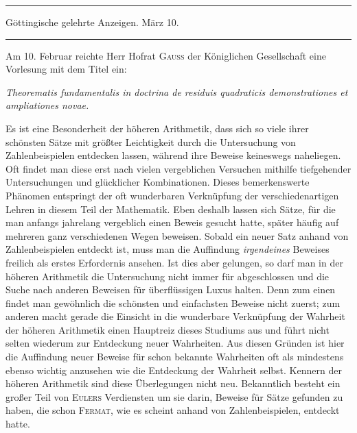 \clearpage
{}%
\begin{center}
\rule{.82\linewidth}{.35pt}\par
Göttingische gelehrte Anzeigen. März 10.\par
\rule{.82\linewidth}{.35pt}
\end{center}
Am 10. Februar reichte Herr Hofrat \textsc{Gauss} der Königlichen Gesellschaft eine Vorlesung mit dem Titel ein:
\begin{center}\itshape
Theorematis fundamentalis in doctrina de residuis quadraticis demonstrationes et ampliationes novae.
\end{center}

Es ist eine Besonderheit der höheren Arithmetik, dass sich so viele ihrer schönsten Sätze mit größter Leichtigkeit durch die Untersuchung von Zahlenbeispielen entdecken lassen, während ihre Beweise keineswegs naheliegen. Oft findet man diese erst nach vielen vergeblichen Versuchen mithilfe tiefgehender Untersuchungen und glücklicher Kombinationen. Dieses bemerkenswerte Phänomen entspringt der oft wunderbaren Verknüpfung der verschiedenartigen Lehren in diesem Teil der Mathematik. Eben deshalb lassen sich Sätze, für die man anfangs jahrelang vergeblich einen Beweis gesucht hatte, später häufig auf mehreren ganz verschiedenen Wegen beweisen. Sobald ein neuer Satz anhand von Zahlenbeispielen entdeckt ist, muss man die Auffindung \emph{irgendeines} Beweises freilich als erstes Erfordernis ansehen. Ist dies aber gelungen, so darf man in der höheren Arithmetik die Untersuchung nicht immer für abgeschlossen und die Suche nach anderen Beweisen für überflüssigen Luxus halten. Denn zum einen findet man gewöhnlich die schönsten und einfachsten
%
Beweise nicht zuerst; zum anderen macht gerade die Einsicht in die wunderbare Verknüpfung der Wahrheit der höheren Arithmetik einen Hauptreiz dieses Studiums aus und führt nicht selten wiederum zur Entdeckung neuer Wahrheiten. Aus diesen Gründen ist hier die Auffindung neuer Beweise für schon bekannte Wahrheiten oft als mindestens ebenso wichtig anzusehen wie die Entdeckung der Wahrheit selbst. Kennern der höheren Arithmetik sind diese Überlegungen nicht neu. Bekanntlich besteht ein großer Teil von \textsc{Eulers} Verdiensten um sie darin, Beweise für Sätze gefunden zu haben, die schon \textsc{Fermat}, wie es scheint anhand von Zahlenbeispielen, entdeckt hatte.

